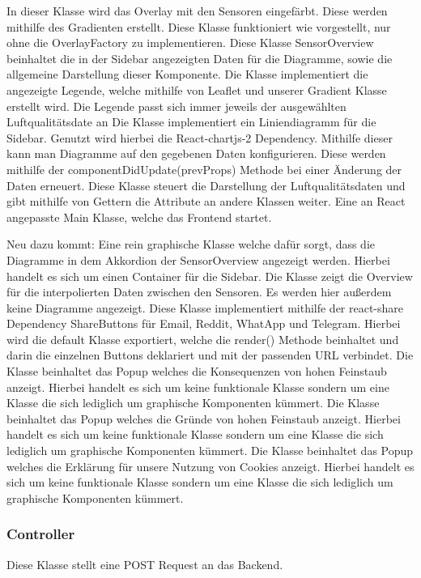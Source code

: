     In dieser Klasse wird das Overlay mit den Sensoren eingefärbt. Diese werden mithilfe des Gradienten erstellt.
    Diese Klasse funktioniert wie vorgestellt, nur ohne die OverlayFactory zu implementieren.
    Diese Klasse SensorOverview beinhaltet die in der Sidebar angezeigten Daten für die Diagramme, sowie die allgemeine Darstellung dieser Komponente.
    Die Klasse implementiert die angezeigte Legende, welche mithilfe von \gls{Leaflet} und unserer Gradient Klasse erstellt wird.
    Die Legende passt sich immer jeweils der ausgewählten Luftqualitätsdate an
    Die Klasse implementiert ein Liniendiagramm für die Sidebar. Genutzt wird hierbei die React-chartjs-2 Dependency.
    Mithilfe dieser kann man Diagramme auf den gegebenen Daten konfigurieren. Diese werden mithilfe der componentDidUpdate(prevProps) Methode
    bei einer Änderung der Daten erneuert.
    \removedClass
{}
    \removedClass
{}
    Diese Klasse steuert die Darstellung der Luftqualitätsdaten und gibt mithilfe von Gettern die Attribute an andere Klassen weiter.
    Eine an React angepasste Main Klasse, welche das Frontend startet.

Neu dazu kommt:
    Eine rein graphische Klasse welche dafür sorgt, dass die Diagramme in dem Akkordion der SensorOverview angezeigt werden.
    Hierbei handelt es sich um einen Container für die Sidebar.
    Die Klasse zeigt die Overview für die interpolierten Daten zwischen den Sensoren. Es werden hier außerdem keine Diagramme angezeigt.
    Diese Klasse implementiert mithilfe der react-share Dependency ShareButtons für Email, Reddit, WhatApp und Telegram.
    Hierbei wird die default Klasse exportiert, welche die render() Methode beinhaltet und darin die einzelnen Buttons deklariert und 
    mit der passenden URL verbindet.
    Die Klasse beinhaltet das Popup welches die Konsequenzen von hohen Feinstaub anzeigt. Hierbei handelt es sich um keine funktionale Klasse sondern um eine Klasse die sich
    lediglich um graphische Komponenten kümmert.
    Die Klasse beinhaltet das Popup welches die Gründe von hohen Feinstaub anzeigt. Hierbei handelt es sich um keine funktionale Klasse sondern um eine Klasse die sich
    lediglich um graphische Komponenten kümmert.
    Die Klasse beinhaltet das Popup welches die Erklärung für unsere Nutzung von \gls{Cookie}s anzeigt. Hierbei handelt es sich um keine funktionale Klasse sondern um eine Klasse die sich
    lediglich um graphische Komponenten kümmert.

\subsubsection{Controller}
    Diese Klasse stellt eine POST Request an das Backend.